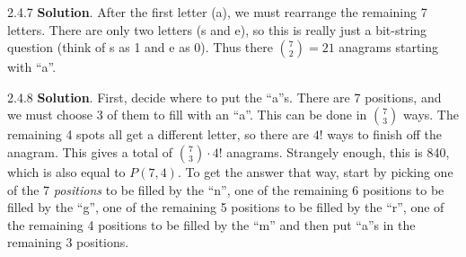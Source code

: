 \documentclass[11pt,]{book}
\theoremstyle{ptxplainnotitle}
\theoremstyle{ptxplaintitle}
\theoremstyle{ptxdefinitionnotitle}
\theoremstyle{ptxdefinitiontitle}
\theoremstyle{ptxdefinitionnotitle}
\theoremstyle{ptxdefinitiontitle}
\theoremstyle{ptxdefinitionnotitle}
\theoremstyle{ptxdefinitiontitle}
\theoremstyle{ptxdefinitiontitlenonumber}
\theoremstyle{ptxdefinitiontitlenonumber}
\numberwithin{equation}{chapter}
\begin{document}
\begin{divisionexercise}{2.4.7}
\textbf{Solution}.\quad%
\hypertarget{p-1550}{}%
After the first letter (a), we must rearrange the remaining 7 letters. There are only two letters (s and e), so this is really just a bit-string question (think of s as 1 and e as 0). Thus there \({7 \choose 2} = 21\) anagrams starting with ``a''.%
\end{divisionexercise}%
\begin{divisionexercise}{2.4.8}
\textbf{Solution}.\quad%
\hypertarget{p-1555}{}%
First, decide where to put the ``a''s. There are 7 positions, and we must choose 3 of them to fill with an ``a''. This can be done in \({7 \choose 3}\) ways. The remaining 4 spots all get a different letter, so there are \(4!\) ways to finish off the anagram. This gives a total of \({7 \choose 3}\cdot 4!\) anagrams. Strangely enough, this is 840, which is also equal to \(P(7,4)\text{.}\) To get the answer that way, start by picking one of the 7 \emph{positions} to be filled by the ``n'', one of the remaining 6 positions to be filled by the ``g'', one of the remaining 5 positions to be filled by the ``r'', one of the remaining 4 positions to be filled by the ``m'' and then put ``a''s in the remaining 3 positions.%
\end{divisionexercise}%
\end{document}

